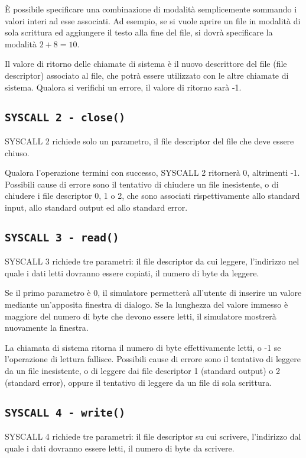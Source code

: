 \documentclass[12pt]{report}
\begin{document}
\`{E} possibile specificare una combinazione di modalit\`{a} semplicemente sommando i valori interi ad esse associati. 
Ad esempio, se si vuole aprire un file in modalit\`{a} di sola scrittura ed aggiungere il testo alla fine del file, 
si dovr\`{a} specificare la modalit\`{a} $2 + 8 = 10$.

Il valore di ritorno delle chiamate di sistema \`{e} il nuovo descrittore del file (file descriptor) associato al file, 
che potr\`{a} essere utilizzato con le altre chiamate di sistema. Qualora si verifichi un errore, il valore di ritorno sar\`{a} -1.


\subsection{\texttt{SYSCALL 2 - close()}}
SYSCALL 2 richiede solo un parametro, il file descriptor del file che deve essere chiuso. 

 Qualora l'operazione termini con successo, SYSCALL 2 ritorner\`{a} 0, altrimenti -1. 
 Possibili cause di errore sono il tentativo di chiudere un file inesistente, o di chiudere i file descriptor 0, 1 o 2, 
 che sono associati rispettivamente allo standard input, allo standard output ed allo standard error.

\subsection{\texttt{SYSCALL 3 - read()}}
SYSCALL 3 richiede tre parametri: il file descriptor da cui leggere, l'indirizzo nel quale i dati letti 
dovranno essere copiati, il numero di byte da leggere.

Se il primo parametro \`{e} 0, il simulatore permetter\`{a} all'utente di inserire un valore mediante un'apposita finestra di dialogo. 
Se la lunghezza del valore immesso \`{e} maggiore del numero di byte che devono essere letti, il simulatore mostrer\`{a} nuovamente la finestra.

La chiamata di sistema ritorna il numero di byte effettivamente letti, o -1 se l'operazione di lettura fallisce. Possibili cause di errore sono 
il tentativo di leggere da un file inesistente, o di leggere dai file descriptor 1 (standard output) o 2 (standard error), 
oppure il tentativo di leggere da un file di sola scrittura. 

\subsection{\texttt{SYSCALL 4 - write()}}
SYSCALL 4 richiede tre parametri: il file descriptor su cui scrivere, l'indirizzo dal quale i dati dovranno essere letti, il numero di byte da scrivere.
\end{document}
